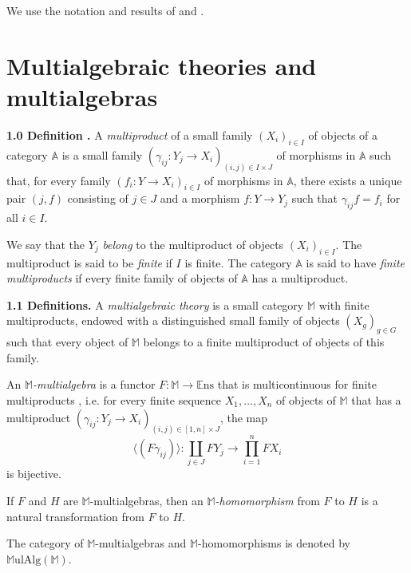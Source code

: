 \documentclass{article}
\newenvironment{rmenv}[1]
  {\phantomsection\par\medskip\noindent\textbf{#1.}\rmfamily}
  {\par\medskip}
\newcommand{\bb}[1]{{\mathbb{#1}}}
\newcommand{\Set}{\mathbb{E}\mathrm{ns}}
\newcommand{\MulAlg}{\mathbb{M}\mathrm{ulAlg}}
\newcommand{\oldpage}[1]{\marginpar{\footnotesize$\Big\vert$ \textit{p.~#1}}}
\begin{document}
We use the notation and results of \cite{2} and \cite{3}.

\oldpage{194}
\section{Multialgebraic theories and multialgebras}

\begin{rmenv}{1.0 Definition \cite{2}}
\label{1.0}
  A \emph{multiproduct} of a small family $(X_i)_{i\in I}$ of objects of a category $\bb{A}$ is a small family $(\gamma_{ij}\colon Y_j\to X_i)_{(i,j)\in I\times J}$ of morphisms in $\bb{A}$ such that, for every family $(f_i\colon Y\to X_i)_{i\in I}$ of morphisms in $\bb{A}$, there exists a unique pair $(j,f)$ consisting of $j\in J$ and a morphism $f\colon Y\to Y_j$ such that $\gamma_{ij}f=f_i$ for all $i\in I$.

  We say that the $Y_j$ \emph{belong} to the multiproduct of objects $(X_i)_{i\in I}$.
  The multiproduct is said to be \emph{finite} if $I$ is finite.
  The category $\bb{A}$ is said to have \emph{finite multiproducts} if every finite family of objects of $\bb{A}$ has a multiproduct.
\end{rmenv}

\begin{rmenv}{1.1 Definitions}
\label{1.1}
  A \emph{multialgebraic theory} is a small category $\bb{M}$ with finite multiproducts, endowed with a distinguished small family of objects $(X_g)_{g\in G}$ such that every object of $\bb{M}$ belongs to a finite multiproduct of objects of this family.

  An \emph{$\bb{M}$-multialgebra} is a functor $F\colon\bb{M}\to\Set$ that is multicontinuous for finite multiproducts \cite{2}, i.e. for every finite sequence $X_1,\ldots,X_n$ of objects of $\bb{M}$ that has a multiproduct $(\gamma_{ij}\colon Y_j\to X_i)_{(i,j)\in[1,n]\times J}$, the map
  \[
    \langle(F\gamma_{ij})\rangle\colon
    \coprod_{j\in J} FY_j \to
    \prod_{i=1}^n FX_i
  \]
  is bijective.

  If $F$ and $H$ are $\bb{M}$-multialgebras, then an \emph{$\bb{M}$-homomorphism} from $F$ to $H$ is a natural transformation from $F$ to $H$.

  The category of $\bb{M}$-multialgebras and $\bb{M}$-homomorphisms is denoted by $\MulAlg(\bb{M})$.
\end{rmenv}
\end{document}
